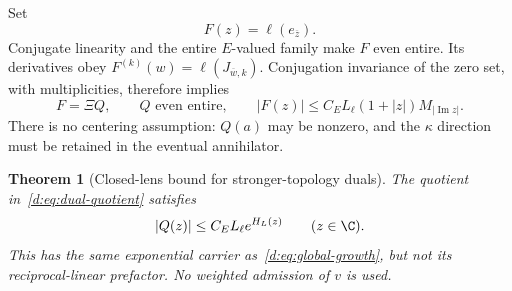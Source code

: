 \documentclass[11pt,a4paper]{article}
\numberwithin{equation}{section}
\newtheorem{theorem}{Theorem}[section]
\theoremstyle{definition}\newtheorem{definition}[theorem]{Definition}
\theoremstyle{remark}\newtheorem{remark}[theorem]{Remark}
\begin{document}
Set
\begin{equation}\label{d:eq:dual-entire}
 F(z)=\ell(e_{\overline z}).
\end{equation}
Conjugate linearity and the entire $E$-valued family make $F$ even entire. Its derivatives obey
$F^{(k)}(w)=\ell(J_{\overline w,k})$.
Conjugation invariance of the zero set, with multiplicities, therefore implies
\begin{equation}\label{d:eq:dual-quotient}
 F=\Xi Q,\qquad Q\text{ even entire},\qquad
 |F(z)|\le C_E L_\ell(1+|z|)M_{|\operatorname{Im}z|}.
\end{equation}
There is no centering assumption: $Q(a)$ may be nonzero, and the $\kappa$ direction must be retained in the eventual annihilator.

\begin{theorem}[Closed-lens bound for stronger-topology duals]\label{d:thm:dual-lens}
The quotient in~\eqref{d:eq:dual-quotient} satisfies
\begin{equation}\label{d:eq:dual-lens}
 |Q(z)|\le C_E L_\ell e^{H_L(z)}\qquad(z\in\C).
\end{equation}
This has the same exponential carrier as~\eqref{d:eq:global-growth}, but not its reciprocal-linear prefactor. No weighted admission of $v$ is used.
\end{theorem}
\end{document}
